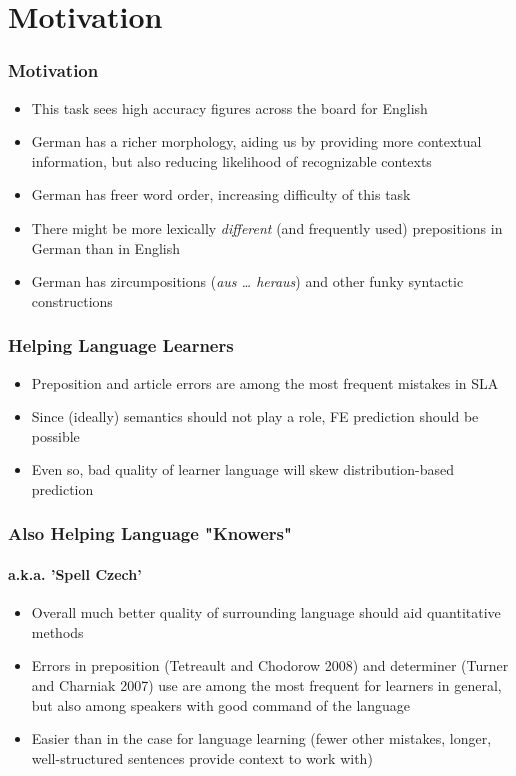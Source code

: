 \documentclass{beamer}
\begin{document}
\section{Motivation}
\begin{frame}
\frametitle{Motivation}
\begin{itemize}
\item This task sees high accuracy figures across the board for English
\item German has a richer morphology, aiding us by providing more contextual
information, but also reducing likelihood of recognizable contexts
\item German has freer word order, increasing difficulty of this task
\item There might be more lexically {\em different} (and frequently used)
prepositions in German than in English
\item German has zircumpositions ({\it aus \ldots{} heraus}) and other funky
syntactic constructions
\end{itemize}
\end{frame}

\begin{frame}
\frametitle{Helping Language Learners}

\begin{itemize}
\item Preposition and article errors are among the most frequent mistakes in SLA
\item Since (ideally) semantics should not play a role, FE prediction should be
possible
\item Even so, bad quality of learner language will skew distribution-based
prediction
\end{itemize}
\end{frame}

\begin{frame}
\frametitle{Also Helping Language "Knowers"}
\framesubtitle{a.k.a. 'Spell Czech'}

\begin{itemize}
\item Overall much better quality of surrounding language should aid
quantitative methods
\item Errors in preposition (Tetreault and Chodorow 2008) and determiner (Turner
and Charniak 2007) use are among the most frequent for learners in general, but
also among speakers with good command of the language
\item Easier than in the case for language learning (fewer other mistakes,
longer, well-structured sentences provide context to work with)
\end{itemize}
\end{frame}
\end{document}
